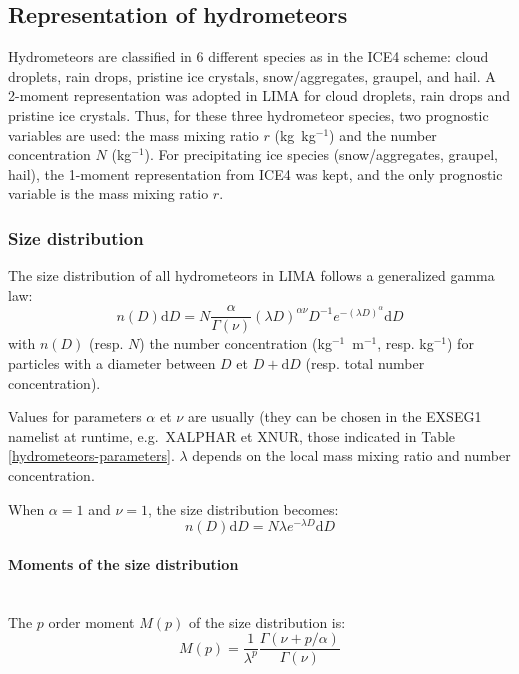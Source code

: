 \subsection{Representation of hydrometeors}
\label{hydrometeors}

Hydrometeors are classified in 6 different species as in the ICE4 scheme: cloud droplets, rain drops, pristine ice crystals, snow/aggregates, graupel, and hail. A 2-moment representation was adopted in LIMA for cloud droplets, rain drops and pristine ice crystals. Thus, for these three hydrometeor species, two prognostic variables are used: the mass mixing ratio $r$ (kg~kg$^{-1}$) and the number concentration $N$ (kg$^{-1}$). For precipitating ice species (snow/aggregates, graupel, hail), the 1-moment representation from ICE4 was kept, and the only prognostic variable is the mass mixing ratio $r$.

\subsubsection{Size distribution}

The size distribution of all hydrometeors in LIMA follows a generalized gamma law:
\begin{equation}
 \label{gamma-gen}
 n(D) \mathrm d D= N \frac{\alpha}{\Gamma(\nu)} (\lambda D)^{\alpha\nu} D^{-1} e^{-(\lambda D)^{\alpha}} \mathrm d D
\end{equation}
with $n(D)$ (resp. $N$) the number concentration (kg$^{-1}$~m$^{-1}$, resp. kg$^{-1}$) for particles with a diameter between $D$ et $D+\mathrm d D$ (resp. total number concentration).

Values for parameters $\alpha$ et $\nu$ are usually (they can be chosen in the EXSEG1 namelist at runtime, e.g.\ XALPHAR et XNUR, those indicated in Table \ref{hydrometeors-parameters}. $\lambda$ depends on the local mass mixing ratio and number concentration.

When $\alpha = 1$ and $\nu = 1$, the size distribution becomes:
\begin{equation}
 n(D) \mathrm d D= N \lambda e^{-\lambda D} \mathrm d D
\end{equation}

\paragraph{Moments of the size distribution}
~\\
The $p$ order moment $M(p)$ of the size distribution is:
\begin{equation}
 M(p) = \frac{1}{\lambda^p} \frac{\Gamma(\nu+p/\alpha)}{\Gamma(\nu)}
\end{equation}

